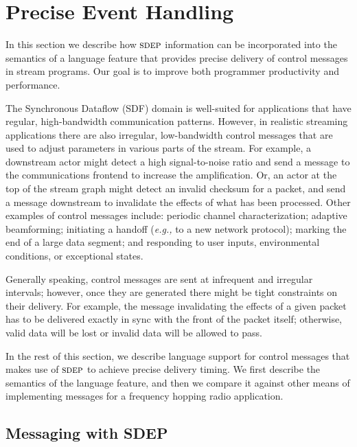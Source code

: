 \section{Precise Event Handling}
In this section we describe how $\textsc{sdep}$ information can be
incorporated into the semantics of a language feature that provides
precise delivery of control messages in stream programs.  Our goal is
to improve both programmer productivity and performance.

The Synchronous Dataflow (SDF) domain is well-suited for applications
that have regular, high-bandwidth communication patterns.  However, in
realistic streaming applications there are also irregular,
low-bandwidth control messages that are used to adjust parameters in
various parts of the stream.  For example, a downstream actor might
detect a high signal-to-noise ratio and send a message to the
communications frontend to increase the amplification.  Or, an actor
at the top of the stream graph might detect an invalid checksum for a
packet, and send a message downstream to invalidate the effects of
what has been processed.  Other examples of control messages include:
periodic channel characterization; adaptive beamforming; initiating a
handoff ({\it e.g.,} to a new network protocol); marking the end of a
large data segment; and responding to user inputs, environmental
conditions, or exceptional states.

Generally speaking, control messages are sent at infrequent and
irregular intervals; however, once they are generated there might be
tight constraints on their delivery.  For example, the message
invalidating the effects of a given packet has to be delivered exactly
in sync with the front of the packet itself; otherwise, valid data
will be lost or invalid data will be allowed to pass.

In the rest of this section, we describe language support for control
messages that makes use of $\textsc{sdep}$ to achieve precise delivery timing.
We first describe the semantics of the language feature, and then we
compare it against other means of implementing messages for a
frequency hopping radio application.

\subsection{Messaging with SDEP}


